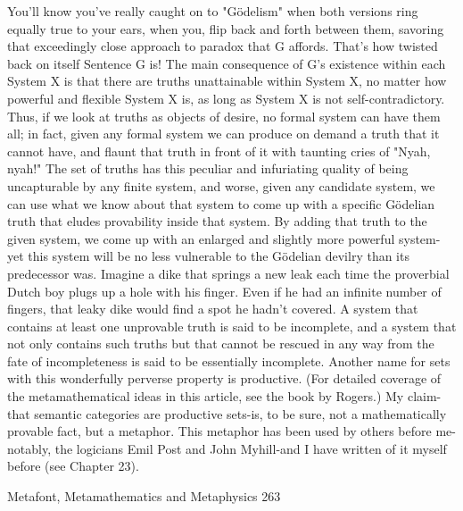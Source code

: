     You'll know you've really caught on to "Gödelism" when both versions ring equally
true to your ears, when you, flip back and forth between them, savoring that exceedingly
close approach to paradox that G affords. That's how twisted back on itself Sentence G
is!
    The main consequence of G's existence within each System X is that there are truths
unattainable within System X, no matter how powerful and flexible System X is, as long
as System X is not self-contradictory. Thus, if we look at truths as objects of desire, no
formal system can have them all; in fact, given any formal system we can produce on
demand a truth that it cannot have, and flaunt that truth in front of it with taunting cries of
"Nyah, nyah!" The set of truths has this peculiar and infuriating quality of being
uncapturable by any finite system, and worse, given any candidate system, we can use
what we know about that system to come up with a specific Gödelian truth that eludes
provability inside that system.
    By adding that truth to the given system, we come up with an enlarged and slightly
more powerful system-yet this system will be no less vulnerable to the Gödelian devilry
than its predecessor was. Imagine a dike that springs a new leak each time the proverbial
Dutch boy plugs up a hole with his finger. Even if he had an infinite number of fingers,
that leaky dike would find a spot he hadn't covered. A system that contains at least one
unprovable truth is said to be incomplete, and a system that not only contains such truths
but that cannot be rescued in any way from the fate of incompleteness is said to be
essentially incomplete. Another name for sets with this wonderfully perverse property is
productive. (For detailed coverage of the metamathematical ideas in this article, see the
book by Rogers.)
    My claim-that semantic categories are productive sets-is, to be sure, not a
mathematically provable fact, but a metaphor. This metaphor has been used by others
before me-notably, the logicians Emil Post and John Myhill-and I have written of it
myself before (see Chapter 23).




Metafont, Metamathematics and Metaphysics                                                 263

